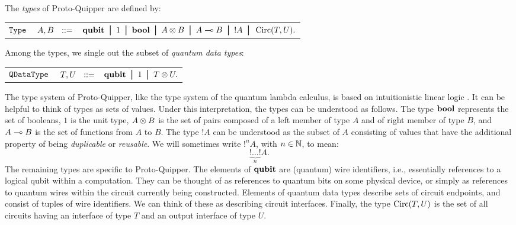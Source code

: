 \documentclass[twoside]{article}
\begin{document}
\begin{definition} 
The \emph{types} of Proto-Quipper are defined by:
\begin{center}
\begin{tabular}{rrl}
$\texttt{Type}$&$~A,B~~::=$ & $ \qubit \bor 1 \bor \bool \bor A\tensor B \bor 
A\loli B \bor {!}A \bor \Circ (T,U).$\\
\end{tabular}
\end{center}
Among the types, we single out the subset of \emph{quantum data types}:
\begin{center}
\begin{tabular}{rrl}
$\texttt{QDataType}$&$~T,U~~::=$ & $\qubit \bor 1 \bor T \tensor U.$
\end{tabular}
\end{center}
\end{definition}

The type system of Proto-Quipper, like the type system of the quantum
lambda calculus, is based on intuitionistic linear logic
{\cite{Gir87}}.  It can be helpful to think of types as sets of
values. Under this interpretation, the types can be understood as
follows. The type $\textrm{\bf bool}$ represents the set of booleans, $1$ is the
unit type, $A\otimes B$ is the set of pairs composed of a left member of
type $A$ and of right member of type $B$, and $A\multimap B$ is the set of
functions from $A$ to $B$. The type ${!}A$ can be understood as the
subset of $A$ consisting of values that have the additional property
of being \emph{duplicable} or \emph{reusable}. We will sometimes write
${!}^nA$, with $n\in\mathbb{N}$, to mean:
\[
\underbrace{{!}\ldots {!}}_{n} A.
\]
The remaining types are specific to Proto-Quipper. The elements of
$\textrm{\bf qubit}$ are (quantum) wire identifiers, i.e., essentially references
to a logical qubit within a computation. They can be thought of as
references to quantum bits on some physical device, or simply as
references to quantum wires within the circuit currently being
constructed. Elements of quantum data types describe sets of circuit
endpoints, and consist of tuples of wire identifiers. We can think of
these as describing circuit interfaces. Finally, the type $\mathop{\textrm{Circ}}\nolimits(T,U)$
is the set of all circuits having an interface of type $T$ and an
output interface of type $U$. 
\end{document}
